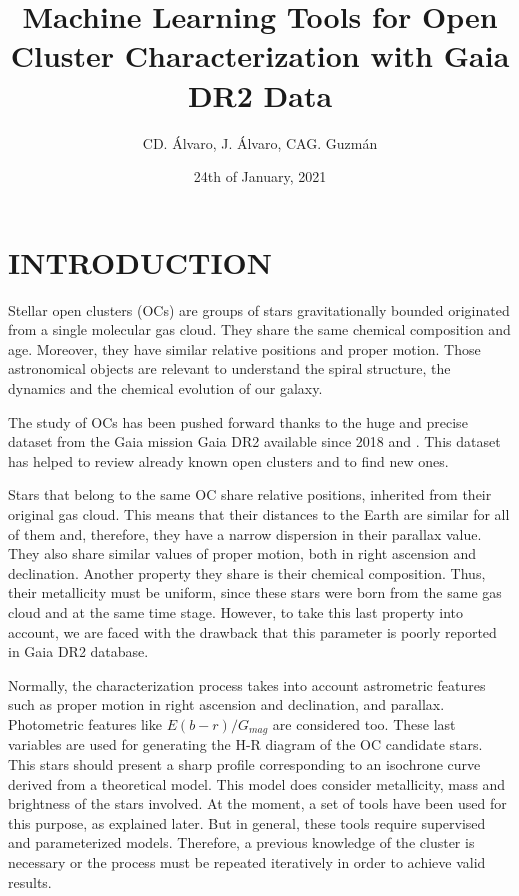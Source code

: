 \documentclass[11pt,a4paper,english,twocolumn]{article}
\title{Machine Learning Tools for Open Cluster Characterization with Gaia DR2 Data}
\author{CD. Álvaro, J. Álvaro, CAG. Guzmán}
\date{24th of January, 2021}
\begin{document}
\twocolumn[
\begin{@twocolumnfalse}
\maketitle
\end{@twocolumnfalse}
]




\section{INTRODUCTION}

Stellar open clusters (OCs) \cite{janes1982open} are groups of stars
gravitationally bounded originated from a single molecular gas cloud.
They share the same chemical composition and age. Moreover,
they have similar relative positions and proper motion.
Those astronomical objects are relevant to understand the spiral structure,
the dynamics and the chemical evolution of our galaxy.

The study of OCs has been pushed forward thanks to the huge and precise dataset
from the Gaia mission Gaia DR2 available since 2018
\cite{collaboration2016description} and \cite{gaia2018gaia}.
This dataset has helped to review already known open clusters and to find new ones.

Stars that belong to the same OC share relative positions,
inherited from their original gas cloud.
This means that their distances to the Earth are similar for all of them and,
therefore, they have a narrow dispersion in their parallax value.
They also share similar values of proper motion, both in right ascension and declination.
Another property they share is their chemical composition.
Thus, their metallicity must be uniform,
since these stars were born from the same gas cloud and at the same time stage.
However, to take this last property into account, we are faced with the drawback
that this parameter is poorly reported in Gaia DR2 database.

Normally, the characterization process takes into account astrometric features
such as proper motion in right ascension and declination, and parallax.
Photometric features like $E(b-r) / G_{mag}$ are considered too.
These last variables are used for generating the H-R diagram of the OC candidate stars.
This stars should present a sharp profile corresponding to an isochrone curve derived
from a theoretical model.
This model does consider metallicity, mass and brightness of the stars involved.
At the moment, a set of tools have been used for this purpose, as explained later.
But in general, these tools require supervised and parameterized models.
Therefore, a previous knowledge of the cluster is necessary or the process must be
repeated iteratively in order to achieve valid results.
\end{document}
